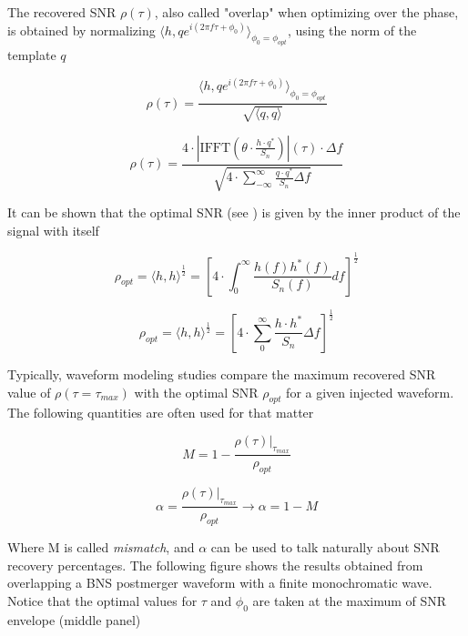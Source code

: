 The recovered SNR $\rho(\tau)$, also called "overlap" when optimizing over the phase, is obtained by normalizing $\langle h,q e^{i(2\pi f \tau + \phi_0)} \rangle_{\phi_0=\phi_{opt}}$, using the norm of the template $q$

\begin{equation}
\rho (\tau) = \frac{\langle h,q e^{i(2\pi f \tau + \phi_0)} \rangle_{\phi_0=\phi_{opt}}}{\sqrt{\langle q,q \rangle}}
\end{equation}


\begin{equation}\label{eq:17}
\rho (\tau)= 
\frac{
4\cdot \left| \mathrm{IFFT}\left(  \theta \cdot \frac{h \cdot q^{*} }{S_n}\right)\right| (\tau) \cdot \Delta f
}
{
\sqrt{4\cdot \sum_{-\infty}^{\infty} \frac{q\cdot q^*}{S_n} \Delta f}
}
\end{equation}

It can be shown that the optimal SNR (see \cite[chapter 5]{Sathyaprakash:2009xs}) is given by the inner product of the signal with itself

\begin{equation}
\rho_{opt} = \langle h,h \rangle^{\frac{1}{2}} = \left[4\cdot\int_{0}^{\infty} \frac{h(f)h^{*}(f)}{S_n(f)}df\right]^{\frac{1}{2}}
\end{equation}

\begin{equation}\label{sopt}
\rho_{opt} = \langle h,h \rangle^{\frac{1}{2}} = \left[4\cdot\sum_{0}^{\infty} \frac{ h\cdot h^{*}}{S_n}\Delta f\right]^{\frac{1}{2}}
\end{equation}

Typically, waveform modeling studies compare the maximum recovered SNR value of $\rho(\tau=\tau_{max})$ with the optimal SNR $\rho_{opt}$ for a given injected waveform. The following quantities are often used for that matter 


\begin{equation}
M = 1-\frac{\rho(\tau)|_{\tau_{max}}}{\rho_{opt}}
\end{equation}

\begin{equation}
\alpha = \frac{\rho(\tau)|_{\tau_{max}}}{\rho_{opt}} \rightarrow \alpha = 1-M
\end{equation}

Where M is called \textit{mismatch}, and $\alpha$ can be used to talk naturally about SNR recovery percentages. The following figure shows the results obtained from overlapping a BNS postmerger waveform with a finite monochromatic wave. Notice that  the optimal values for $\tau$ and $\phi_0$ are taken at the maximum of SNR envelope (middle panel)



